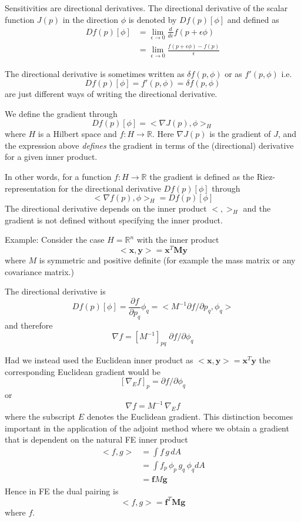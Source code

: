 \documentclass[10pt,a4paper]{book}
\newcommand{\p}{\partial}
\begin{document}
Sensitivities are directional derivatives. The directional derivative
of the scalar function $J(p)$ in the direction $\phi$
is denoted by $D f(p)[\phi]$ and defined as
\begin{align*}
 D f(p)[\phi] &= \lim_{\epsilon \to 0} \frac{d}{d \epsilon} f(p+\epsilon \phi)  \\
               &= \lim_{\epsilon \to 0}  \frac{f(p+\epsilon \phi)-f(p)}{\epsilon}
\end{align*}

The directional derivative is sometimes written as $\delta f(p,\phi)$
or as $f'(p,\phi)$ i.e.
\[
D f(p)[\phi]=f'(p,\phi)=\delta f(p,\phi)
\]
are just different ways of writing the directional derivative.

We define the gradient through 
\[
 D f(p)[\phi]  = < \nabla J(p), \phi >_H
\]
where $H$ is a Hilbert space and $f: H \to \mathbb{R}$. 
Here $\nabla J(p)$ is the gradient of $J$, and the expression above
{\em defines} the gradient in terms of the (directional) derivative
for a given inner product.

In other words, for a function $f:H \to \mathbb{R}$ the gradient is
defined as the Riez-representation for the directional derivative
$D f(p)[\phi]$ through
\[
< \nabla f (p) , \phi>_H= D f(p)[\phi] 
\]
The directional derivative depends on the inner product $< , >_H$ and
the gradient is not defined without specifying the inner product.

Example: Consider the case $H=\mathbb{R}^n$ with the inner product 
\[
<\bm{x},\bm{y}> = \bm{x}^T \bm{M} \bm{y}
\]
where $M$ is symmetric and positive definite (for example the mass
matrix or any covariance matrix.)

The directional derivative is
\[
D f(p)[\phi]=\frac{\p f}{\p p_q} \phi_q = < M^{-1} \p f / \p p_q, \phi_q> 
\]
and therefore 
\[
 \nabla f = [ M^{-1}]_{pq} \; \p f /\p \phi_q  
\] 

Had we instead used the Euclidean inner product as $<\bm{x},\bm{y}> = \bm{x}^T
\bm{y}$
the corresponding Euclidean gradient would be 
\[
 [\nabla_E f ]_p = \p f /\p \phi_q  
\] 
or
\[
 \nabla f  = M^{-1} \, \nabla_{E} f
\]
where the subscript $E$ denotes the Euclidean gradient. This
distinction becomes important in the application of the adjoint method
where we obtain a gradient that is dependent on the natural FE inner
product 
\begin{align*}
< f , g> &= \int f \, g \, dA \\
         &=\int f_p \, \phi_p  \, g_q \, \phi_q  dA\\
         &= \bm{f} M \bm{g} 
\end{align*}
Hence in FE the dual pairing is 
\[
< f , g > = \bm{f}^T \bm{M} \bm{g}
\]
where $f$.
\end{document}
